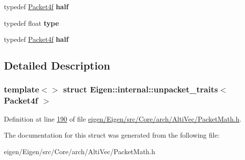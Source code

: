\begin{DoxyCompactItemize}
typedef \hyperlink{struct_eigen_1_1internal_1_1_packet4f}{Packet4f} {\bfseries half}
\item 
\mbox{\label{struct_eigen_1_1internal_1_1unpacket__traits_3_01_packet4f_01_4_aec581636b9b1f84c6f7900dd54f7933e}} 
typedef float {\bfseries type}
\item 
\mbox{\label{struct_eigen_1_1internal_1_1unpacket__traits_3_01_packet4f_01_4_a6fd79255574a93f1ca0eb2eb62ca1417}} 
typedef \hyperlink{struct_eigen_1_1internal_1_1_packet4f}{Packet4f} {\bfseries half}
\end{DoxyCompactItemize}


\subsection{Detailed Description}
\subsubsection*{template$<$$>$\newline
struct Eigen\+::internal\+::unpacket\+\_\+traits$<$ Packet4f $>$}



Definition at line \hyperlink{eigen_2_eigen_2src_2_core_2arch_2_alti_vec_2_packet_math_8h_source_l00190}{190} of file \hyperlink{eigen_2_eigen_2src_2_core_2arch_2_alti_vec_2_packet_math_8h_source}{eigen/\+Eigen/src/\+Core/arch/\+Alti\+Vec/\+Packet\+Math.\+h}.



The documentation for this struct was generated from the following file\+:\begin{DoxyCompactItemize}
\item 
eigen/\+Eigen/src/\+Core/arch/\+Alti\+Vec/\+Packet\+Math.\+h\end{DoxyCompactItemize}
